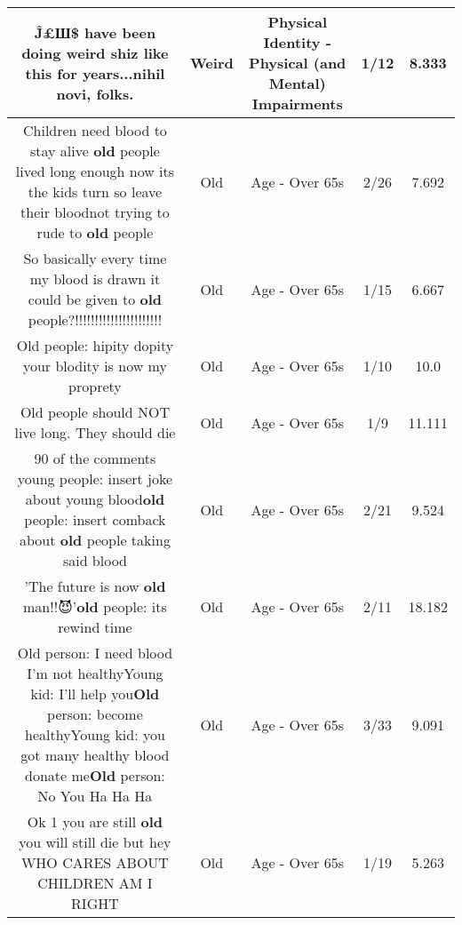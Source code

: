 \documentclass[11pt]{article}
\newlength\mylength
\begin{document}
\begin{center}
\begin{longtable}{|C{.65\mylength}|C{.30\mylength}|C{.12\mylength}|C{.12\mylength}|C{.12\mylength}|}
  \small Ĵ£Ш\$ have been doing \textbf{weird} shiz like this for years...nihil novi, folks.\normalsize   & Weird & Physical Identity - Physical (and Mental) Impairments & 1/12 & 8.333 \\  \hline
  \small Children need blood to stay alive \textbf{old} people lived long enough now its the kids turn so leave their bloodnot trying to rude to \textbf{old} people\normalsize   & Old & Age - Over 65s & 2/26 & 7.692 \\  \hline
  \small So basically every time my blood is drawn it could be given to \textbf{old} people?!!!!!!!!!!!!!!!!!!!!!!\normalsize   & Old & Age - Over 65s & 1/15 & 6.667 \\  \hline
  \small Old people: hipity dopity your blodity is now my proprety\normalsize   & Old & Age - Over 65s & 1/10 & 10.0 \\  \hline
  \small Old people should NOT live long. They should die\normalsize   & Old & Age - Over 65s & 1/9 & 11.111 \\  \hline
  \small 90 of the comments young people: insert joke about young blood\textbf{old} people: insert comback about \textbf{old} people taking said blood\normalsize   & Old & Age - Over 65s & 2/21 & 9.524 \\  \hline
  \small 'The future is now \textbf{old} man!!😈'\textbf{old} people: its rewind time\normalsize   & Old & Age - Over 65s & 2/11 & 18.182 \\  \hline
  \small Old person:   I need blood I'm not healthyYoung kid:    I'll help you\textbf{Old} person:   become healthyYoung kid:     you got many healthy blood donate me\textbf{Old} person:   No You Ha Ha Ha\normalsize   & Old & Age - Over 65s & 3/33 & 9.091 \\  \hline
  \small Ok 1 you are still \textbf{old} you will still die but hey WHO CARES ABOUT CHILDREN AM I RIGHT\normalsize   & Old & Age - Over 65s & 1/19 & 5.263 \\  \hline

\end{longtable}
\end{center}
\end{document}
